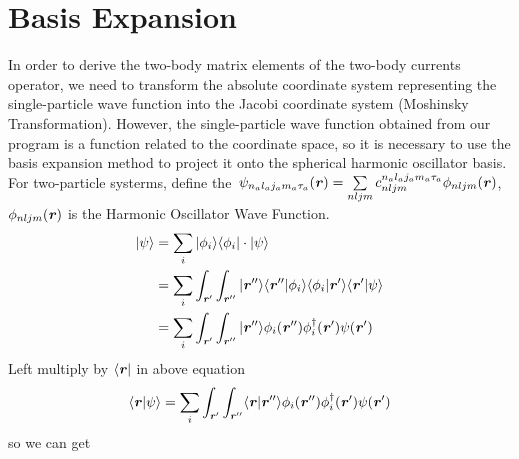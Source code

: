 \documentclass[master]{shnuthesis}
\newcommand{\bmr}{\textbf{\textit{r}}}
\begin{document}
\chapter{Basis Expansion}
In order to derive the two-body matrix elements of the two-body currents operator, we need to transform the absolute coordinate system representing the single-particle wave function into the Jacobi coordinate system (Moshinsky Transformation). However, the single-particle wave function obtained from our program is a function related to the coordinate space, so it is necessary to use the basis expansion method to project it onto the spherical harmonic oscillator basis. \\
\indent For two-particle systerms, define the\,\,\,$\psi_{n_a l_a j_a m_a \tau_a}(\bmr) = \sum\limits_{n l j m} c_{nljm}^{n_a l_a j_a m_a \tau_a} \phi_{nljm}(\bmr)$, $\phi_{nljm}(\bmr)$ is the Harmonic Oscillator Wave Function. 
\begin{align}
    |\psi\rangle &= \sum_{i} |\phi_i\rangle \langle\phi_i| \cdot |\psi\rangle \\
    &= \sum_{i} \int_{\bmr^{\prime}}\int_{\bmr^{\prime\prime}} |\bmr^{\prime\prime} \rangle \langle \bmr^{\prime\prime} |\phi_i\rangle \langle \phi_i|\bmr^{\prime}\rangle \langle \bmr^{\prime}|\psi\rangle \\
    &= \sum_{i} \int_{\bmr^{\prime}}\int_{\bmr^{\prime\prime}} |\bmr^{\prime\prime} \rangle \phi_i(\bmr^{\prime\prime}) \phi_i^\dagger(\bmr^{\prime}) \psi(\bmr^{\prime})
\end{align}
Left multiply by $\langle \bmr|$ in above equation
\begin{align}
    \langle \bmr|\psi\rangle = \sum_{i} \int_{\bmr^{\prime}}\int_{\bmr^{\prime\prime}} \langle \bmr|\bmr^{\prime\prime} \rangle \phi_i(\bmr^{\prime\prime}) \phi_i^\dagger(\bmr^{\prime}) \psi(\bmr^{\prime})
\end{align}
so we can get
\end{document}
